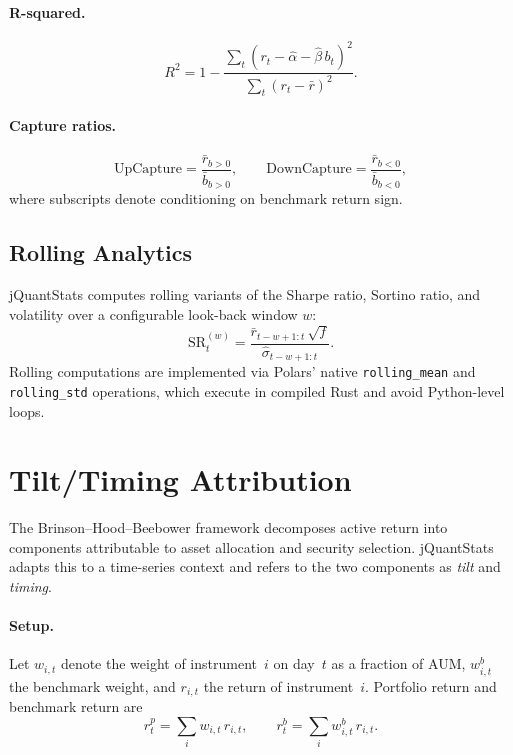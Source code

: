 \documentclass[11pt,a4paper]{article}
\begin{document}
\paragraph{R-squared.}
\begin{equation}
  R^2 = 1 - \frac{\sum_t(r_t - \hat\alpha - \hat\beta\,b_t)^2}{\sum_t(r_t - \bar r)^2}.
\end{equation}

\paragraph{Capture ratios.}
\begin{equation}
  \mathrm{UpCapture} = \frac{\bar{r}_{b>0}}{\bar{b}_{b>0}}, \qquad
  \mathrm{DownCapture} = \frac{\bar{r}_{b<0}}{\bar{b}_{b<0}},
\end{equation}
where subscripts denote conditioning on benchmark return sign.

\subsection{Rolling Analytics}

jQuantStats computes rolling variants of the Sharpe ratio, Sortino ratio, and
volatility over a configurable look-back window $w$:
\begin{equation}
  \mathrm{SR}_t^{(w)} = \frac{\bar{r}_{t-w+1:t}\,\sqrt{f}}
                              {\hat\sigma_{t-w+1:t}}.
\end{equation}
Rolling computations are implemented via Polars' native
\texttt{rolling\_mean} and \texttt{rolling\_std} operations, which execute in
compiled Rust and avoid Python-level loops.

\section{Tilt/Timing Attribution}
\label{sec:attribution}

The Brinson--Hood--Beebower \citep{brinson1986} framework decomposes active
return into components attributable to asset allocation and security selection.
jQuantStats adapts this to a time-series context and refers to the two
components as \emph{tilt} and \emph{timing}.

\paragraph{Setup.}
Let $w_{i,t}$ denote the weight of instrument~$i$ on day~$t$ as a fraction of
AUM, $w_{i,t}^b$ the benchmark weight, and $r_{i,t}$ the return of instrument~$i$.
Portfolio return and benchmark return are
\begin{equation}
  r_t^p = \sum_i w_{i,t}\,r_{i,t}, \qquad r_t^b = \sum_i w_{i,t}^b\,r_{i,t}.
\end{equation}
\end{document}
